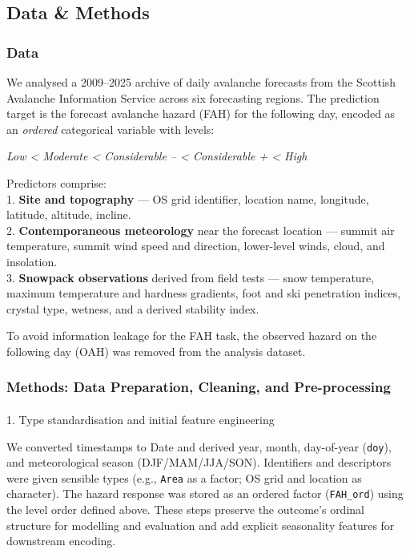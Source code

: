 \documentclass[
  letterpaper,
  DIV=11,
  numbers=noendperiod]{scrartcl}
\makeatletter
\let\oldparagraph\paragraph
\renewcommand{\paragraph}{
    \@ifstar
      \xxxParagraphStar
      \xxxParagraphNoStar
  }
\newcommand{\xxxParagraphStar}[1]{\oldparagraph*{#1}\mbox{}}
\newcommand{\xxxParagraphNoStar}[1]{\oldparagraph{#1}\mbox{}}
\makeatother
\begin{document}
\subsection{Data \& Methods}\label{data-methods}

\subsubsection{Data}\label{data}

We analysed a 2009--2025 archive of daily avalanche forecasts from the
Scottish Avalanche Information Service across six forecasting regions.
The prediction target is the forecast avalanche hazard (FAH) for the
following day, encoded as an \emph{ordered} categorical variable with
levels:

\emph{Low \textless{} Moderate \textless{} Considerable -- \textless{}
Considerable + \textless{} High}

Predictors comprise:\\
1. \textbf{Site and topography} --- OS grid identifier, location name,
longitude, latitude, altitude, incline.\\
2. \textbf{Contemporaneous meteorology} near the forecast location ---
summit air temperature, summit wind speed and direction, lower-level
winds, cloud, and insolation.\\
3. \textbf{Snowpack observations} derived from field tests --- snow
temperature, maximum temperature and hardness gradients, foot and ski
penetration indices, crystal type, wetness, and a derived stability
index.

To avoid information leakage for the FAH task, the observed hazard on
the following day (OAH) was removed from the analysis dataset.

\subsubsection{Methods: Data Preparation, Cleaning, and
Pre-processing}\label{methods-data-preparation-cleaning-and-pre-processing}

\paragraph{1. Type standardisation and initial feature
engineering}\label{type-standardisation-and-initial-feature-engineering}

We converted timestamps to Date and derived year, month, day-of-year
(\texttt{doy}), and meteorological season (DJF/MAM/JJA/SON). Identifiers
and descriptors were given sensible types (e.g., \texttt{Area} as a
factor; OS grid and location as character). The hazard response was
stored as an ordered factor (\texttt{FAH\_ord}) using the level order
defined above. These steps preserve the outcome's ordinal structure for
modelling and evaluation and add explicit seasonality features for
downstream encoding.
\end{document}
